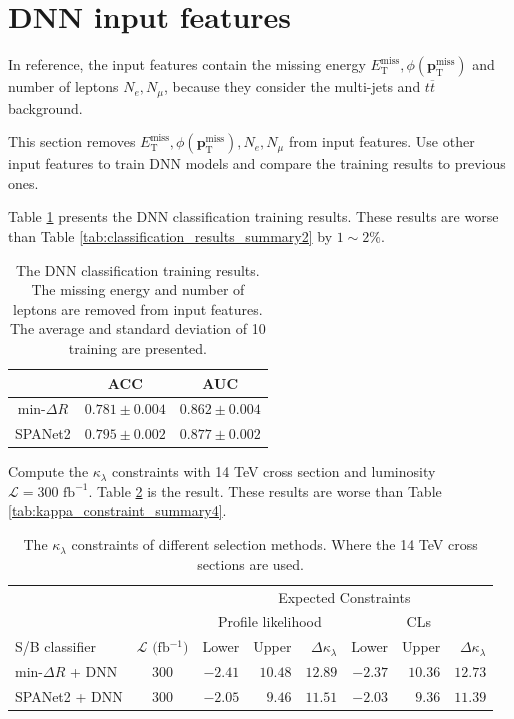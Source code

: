 \documentclass[12pt]{article}
\renewcommand{\vec}[1]{\boldsymbol{\mathbf{#1}}}
\begin{document}
\section{DNN input features}%
\label{sec:dnn_input_features}
	In reference, the input features contain the missing energy $E_{\text{T}}^{\text{miss}}, \phi(\vec{p}_{\text{T}}^{\text{miss}})$ and number of leptons $N_e, N_\mu$, because they consider the multi-jets and $t\overline{t}$ background.

	This section removes $E_{\text{T}}^{\text{miss}}, \phi(\vec{p}_{\text{T}}^{\text{miss}}), N_e, N_\mu$ from input features. Use other input features to train DNN models and compare the training results to previous ones.

	Table \ref{tab:DNN_no_missing_energy_cls_results} presents the DNN classification training results. These results are worse than Table \ref{tab:classification_results_summary2} by $1\sim 2\%$.
	\begin{table}[htpb]
		\centering
		\caption{The DNN classification training results. The missing energy and number of leptons are removed from input features. The average and standard deviation of 10 training are presented.}
		\label{tab:DNN_no_missing_energy_cls_results}
		\begin{tabular}{c|cc}
			& ACC     & AUC   \\ \hline
			$\text{min-}\Delta R$   & $0.781 \pm 0.004$ & $0.862 \pm 0.004$ \\
			SPANet2                 & $0.795 \pm 0.002$ & $0.877 \pm 0.002$
		\end{tabular}      
	\end{table}

	Compute the $\kappa_\lambda$ constraints with 14 TeV cross section and luminosity $\mathcal{L} = \text{300 fb}^{-1}$. Table \ref{tab:kappa_constraint_DNN_no_missing_energy} is the result. These results are worse than Table \ref{tab:kappa_constraint_summary4}.
	\begin{table}[htpb]
		\centering
		\caption{The $\kappa_\lambda$ constraints of different selection methods. Where the 14 TeV cross sections are used.}
		\label{tab:kappa_constraint_DNN_no_missing_energy}
		\begin{tabular}{l|c|rrr|rrr}
									  &                                   & \multicolumn{6}{c}{Expected Constraints}                                          \\
									  &                                   & \multicolumn{3}{c}{Profile likelihood}  & \multicolumn{3}{c}{CLs}                 \\ \hline
		S/B classifier                & $\mathcal{L} \text{ (fb$^{-1}$)}$ & Lower & Upper & $\Delta \kappa_\lambda$ & Lower & Upper & $\Delta \kappa_\lambda$ \\ \hline
		$\text{min-}\Delta R$ + DNN   & 300  & $-2.41 $ & $10.48$& $12.89$ & $-2.37$ & $10.36$ & $12.73$ \\
		SPANet2 + DNN                 & 300  & $-2.05 $ & $9.46$ & $11.51$ & $-2.03$ & $9.36$  & $11.39$ \\
		\end{tabular}
	\end{table}
\end{document}
